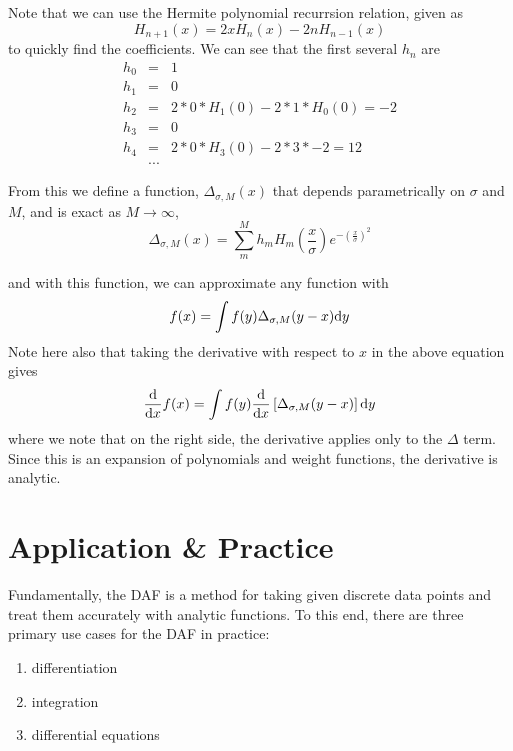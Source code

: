 \documentclass[preprint]{revtex4}
\begin{document}
Note that we can use the Hermite polynomial recurrsion relation, given as
\begin{equation}
\label{eqn_HermiteRecur}
H_{n+1}(x) = 2xH_n(x)-2nH_{n-1}(x)
\end{equation}
to quickly find the coefficients. We can see that the first several $h_n$  are
\begin{eqnarray}
h_0 & =&  1 \nonumber \\
h_1 &=& 0 \nonumber \\
h_2 &=& 2*0*H_1(0)-2*1*H_0(0) = -2 \nonumber \\
h_3 &=& 0 \nonumber \\
h_4 &=& 2*0*H_3(0) - 2*3*-2= 12 \nonumber \\
&...& \nonumber
\end{eqnarray}

From this we define a function, $\Delta_{\sigma,M}(x)$ that depends parametrically on
$\sigma$ and $M$, and is exact as $M\to\infty$, 
\begin{equation}
\label{eqn_DeltaExpansion}
\Delta_{\sigma,M}(x) = \sum_m^M h_m H_m \left(\frac{x}{\sigma}\right)e^{- \left(\frac{x}{\sigma}\right)^2}
\end{equation}

and with this function, we can approximate any function with
\begin{equation}
\label{eqn_f0delta_ident}
f(x) = \int f(y)\Delta_{\sigma,M}(y-x) {\rm d}y
\end{equation}
Note here also that taking the derivative with respect to $x$ in the above equation
gives
\begin{equation}
\label{eqn_f1delta_ident}
\frac{{\rm d}}{{\rm d}x}f(x) = 
    \int f(y) \frac{{\rm d}}{{\rm d}x}\left[\Delta_{\sigma,M}(y-x)\right] {\rm d}y
\end{equation}
where we note that on the right side, the derivative applies only to the $\Delta$ term. 
Since this is an expansion of polynomials and weight functions, the derivative is analytic. 


\section{Application & Practice}
Fundamentally, the DAF is a method for taking given discrete data points and treat them
accurately with analytic functions. To this end, there are three primary use cases for the
DAF in practice: 
\begin{enumerate}
\item differentiation
\item integration
\item differential equations
\end{enumerate}
\end{document}
